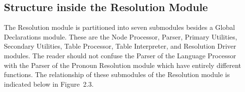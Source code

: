 \documentclass{article}
\begin{document}

\subsection{Structure inside the Resolution Module}

The Resolution module is partitioned into seven submodules
besides a Global Declarations module. These are the Node
Processor, Parser, Primary Utilities, Secondary Utilities, Table
Processor, Table Interpreter, and
Resolution Driver modules. The reader should not confuse the
Parser of the Language Processor with the Parser of the Pronoun
Resolution module which have entirely different functions. The
relationship of these submodules of the Resolution module is
indicated below in Figure~2.3.
\end{document}
